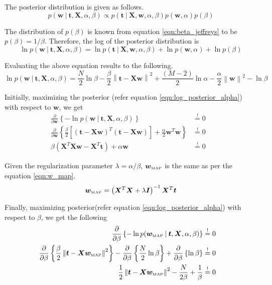 \documentclass[11pt]{article}
\newcommand{\eye}{\bm{I}}
\newcommand{\map}[1]{{#1}_{\text{\tiny MAP}}}
\newcommand\given[1][]{\:#1\vert\:}
\newcommand{\norm}[1]{\left\lVert#1\right\rVert}
\begin{document}
The posterior distribution is given as follows.
\begin{equation}
    p(\bm{w} \given \bm{t}, \bm{X}, \alpha, \beta) \propto p(\bm{t} \given \bm{X}, \bm{w}, \alpha, \beta) p(\bm{w}, \alpha) p(\beta)
\end{equation}

The distribution of $p(\beta)$ is known from equation \ref{eqn:beta_jeffreys} to be $p(\beta) = 1/\beta$. Therefore, the log of the posterior distribution is
\begin{equation}
    \ln{p(\bm{w} \given \bm{t}, \bm{X}, \alpha, \beta)} = \ln{p(\bm{t} \given \bm{X}, \bm{w}, \alpha, \beta)} + \ln{p(\bm{w}, \alpha)} + \ln{p(\beta)}
\end{equation}

Evaluating the above equation results to the following.
\begin{equation} \label{eqn:log_posterior_alpha}
    \ln{p(\bm{w} \given \bm{t}, \bm{X}, \alpha, \beta)} = \frac{N}{2}\ln{\beta}  - \frac{\beta}{2} \norm{\bm{t} - \bm{Xw}}^2 + \frac{\left(M-2\right)}{2} \ln{\alpha} - \frac{\alpha}{2}\norm{\bm{w}}^2 - \ln{\beta}
\end{equation}

Initially, maximizing the posterior (refer equation \ref{eqn:log_posterior_alpha}) with respect to $\bm{w}$, we get
\begin{eqnarray}
    \frac{\partial }{\partial  \bm{w}} \left\{ -\ln{p(\bm{w} \given \bm{t}, \bm{X}, \alpha, \beta)} \right\} 
    &\overset{!}{=} 0& \\
    \frac{\partial }{\partial \bm{w}} \left\{\frac{\beta}{2} \left[ \left(\bm{t} - \bm{X}\bm{w}\right)^T \left(\bm{t} - \bm{X}\bm{w}\right)\right] + \frac{\alpha}{2}\bm{w}^T\bm{w}\right\}
    &\overset{!}{=} 0& \\
    \beta \left( \bm{X}^T\bm{X}\bm{w} - \bm{X}^T \bm{t} \right) + \alpha\bm{w}
    &\overset{!}{=} 0& 
\end{eqnarray}

Given the regularization parameter $\lambda = \alpha/\beta$, $\map{\bm{w}}$ is the same as per the equation \ref{eqn:w_map}.
\begin{equation}
    \map{\bm{w}} = \left(\bm{X}^T\bm{X} + \lambda\eye\right)^{-1}\bm{X}^T\bm{t}
\end{equation}

Finally, maximizing posterior(refer equation \ref{eqn:log_posterior_alpha}) with respect to $\beta$, we get the following
\begin{eqnarray}
    \frac{\partial }{\partial  \beta} \left\{ -\ln{p(\map{\bm{w}} \given \bm{t}, \bm{X}, \alpha, \beta)} \right\} 
    &\overset{!}{=} 0& \\
    \frac{\partial }{\partial \beta} \left\{\frac{\beta}{2} \norm{\bm{t} - \bm{X}\map{\bm{w}}}^2 \right\}
    - \frac{\partial }{\partial \beta} \left\{\frac{N}{2}\ln{\beta} \right\} + \frac{\partial }{\partial \beta} \left\{ \ln{\beta} \right\}
    &\overset{!}{=} 0& \\
    \frac{1}{2} \norm{\bm{t} - \bm{X}\map{\bm{w}}}^2 - \frac{N}{2\beta} + \frac{1}{\beta}
    &\overset{!}{=} 0&
\end{eqnarray}
\end{document}
